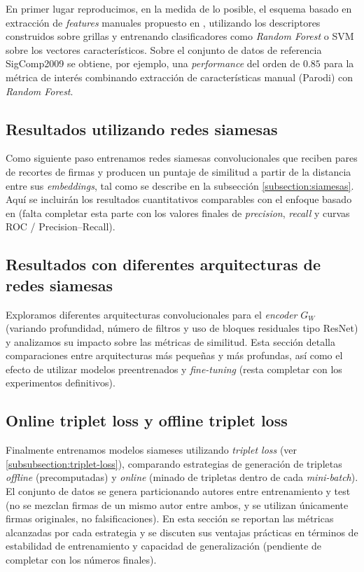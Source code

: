 En primer lugar reproducimos, en la medida de lo posible, el esquema basado en extracción de \textit{features} manuales propuesto en \cite{tesis-parodi}, utilizando los descriptores construidos sobre grillas y entrenando clasificadores como \textit{Random Forest} o SVM sobre los vectores característicos. Sobre el conjunto de datos de referencia SigComp2009 se obtiene, por ejemplo, una \textit{performance} del orden de $0.85$ para la métrica de interés combinando extracción de características manual (Parodi) con \textit{Random Forest}.

\subsection{Resultados utilizando redes siamesas}

Como siguiente paso entrenamos redes siamesas convolucionales que reciben pares de recortes de firmas y producen un puntaje de similitud a partir de la distancia entre sus \textit{embeddings}, tal como se describe en la subsección \ref{subsection:siamesas}. Aquí se incluirán los resultados cuantitativos comparables con el enfoque basado en \cite{tesis-parodi} (falta completar esta parte con los valores finales de \textit{precision}, \textit{recall} y curvas ROC / Precision--Recall).

\subsection{Resultados con diferentes arquitecturas de redes siamesas}

Exploramos diferentes arquitecturas convolucionales para el \textit{encoder} $G_W$ (variando profundidad, número de filtros y uso de bloques residuales tipo ResNet) y analizamos su impacto sobre las métricas de similitud. Esta sección detalla comparaciones entre arquitecturas más pequeñas y más profundas, así como el efecto de utilizar modelos preentrenados y \textit{fine-tuning} (resta completar con los experimentos definitivos).

\subsection{Online triplet loss y offline triplet loss}

Finalmente entrenamos modelos siameses utilizando \textit{triplet loss} (ver \ref{subsubsection:triplet-loss}), comparando estrategias de generación de tripletas \textit{offline} (precomputadas) y \textit{online} (minado de tripletas dentro de cada \textit{mini-batch}). El conjunto de datos se genera particionando autores entre entrenamiento y test (no se mezclan firmas de un mismo autor entre ambos, y se utilizan únicamente firmas originales, no falsificaciones). En esta sección se reportan las métricas alcanzadas por cada estrategia y se discuten sus ventajas prácticas en términos de estabilidad de entrenamiento y capacidad de generalización (pendiente de completar con los números finales).

